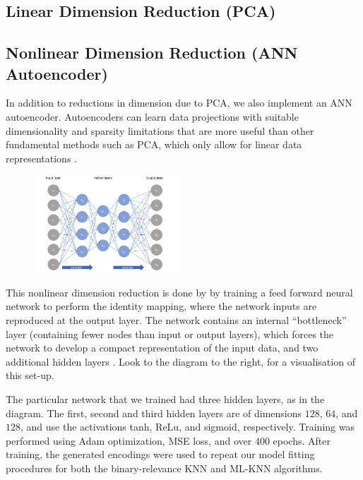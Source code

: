 \documentclass{article}
\begin{document}
\subsection{Linear Dimension Reduction (PCA)}

\subsection{Nonlinear Dimension Reduction (ANN Autoencoder)}

In addition to reductions in dimension due to PCA, we also implement an ANN autoencoder. Autoencoders can learn data projections with suitable dimensionality and sparsity limitations that are more useful than other fundamental methods such as PCA, which only allow for linear data representations \autocite{Alkhayrat}.

\begin{figure}
    \begin{center}
        \includegraphics[width=0.48\textwidth]{autoencoder_diagram.png}
    \end{center}
\end{figure}

This nonlinear dimension reduction is done by by training a feed forward neural
network to perform the identity mapping, where the network inputs are reproduced
at the output layer. The network contains an internal “bottleneck” layer (containing fewer nodes than input or output layers), which forces the network to develop a compact representation of the input data, and two additional hidden layers \autocite{Kramer}. Look to the diagram to the right, for a visualisation of this set-up. 

The particular network that we trained had three hidden layers, as in the diagram. The first, second and third hidden layers are of dimensions $128$, $64$, and $128$, and use the activations tanh, ReLu, and sigmoid, respectively. Training was performed using Adam optimization, MSE loss, and over $400$ epochs. After training, the generated encodings were used to repeat our model fitting procedures for both the binary-relevance KNN and ML-KNN algorithms. 
\end{document}
